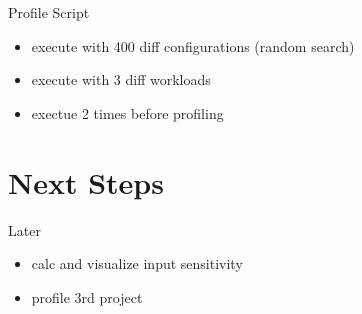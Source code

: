 \documentclass[11pt,aspectratio=169]{beamer}
\begin{document}
\begin{frame}{Profile Script}
  \begin{itemize}
    \item execute with 400 diff configurations (random search)
    \item execute with 3 diff workloads
    \item exectue 2 times before profiling
  \end{itemize}
\end{frame}

\section{Next Steps}

\begin{frame}{Later}
  \begin{itemize}
    \item calc and visualize input sensitivity 
    \item profile 3rd project
  \end{itemize}
\end{frame}


\appendix
\end{document}
